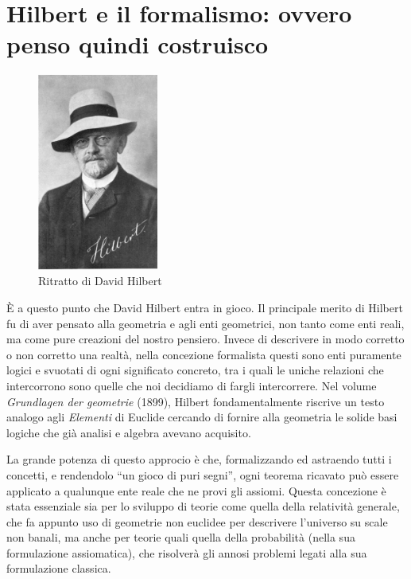 \documentclass[a4paper,10pt]{article}
\begin{document}
\section{Hilbert e il formalismo: ovvero penso quindi costruisco}

\begin{figure}
 \begin{center}
  \includegraphics[width=150px]{./pics/hilbert2.jpg}
 \end{center}
\caption{Ritratto di David Hilbert}
\end{figure}

È a questo punto che David Hilbert entra in gioco.
Il principale merito di Hilbert fu di aver pensato alla geometria e agli enti geometrici, non tanto come enti reali, ma come pure creazioni del nostro pensiero. Invece di descrivere in modo corretto o non corretto una realtà, nella concezione formalista questi sono enti puramente logici e svuotati di ogni significato concreto, tra i quali le uniche relazioni che intercorrono sono quelle che noi decidiamo di fargli intercorrere.
Nel volume \textit{Grundlagen der geometrie} \cite{grundlagen} (1899), Hilbert fondamentalmente riscrive un testo analogo agli \textit{Elementi} di Euclide cercando di fornire alla geometria le solide basi logiche che già analisi e algebra avevano acquisito.

La grande potenza di questo approcio è che, formalizzando ed astraendo tutti i concetti, e rendendolo “un gioco di puri segni”, ogni teorema ricavato può essere applicato a qualunque ente reale che ne provi gli assiomi. Questa concezione è stata essenziale sia per lo sviluppo di teorie come quella della relatività generale, che fa appunto uso di geometrie non euclidee per descrivere l'universo su scale non banali, ma anche per teorie quali quella della probabilità (nella sua formulazione assiomatica), che risolverà gli annosi problemi legati alla sua formulazione classica.
\end{document}
